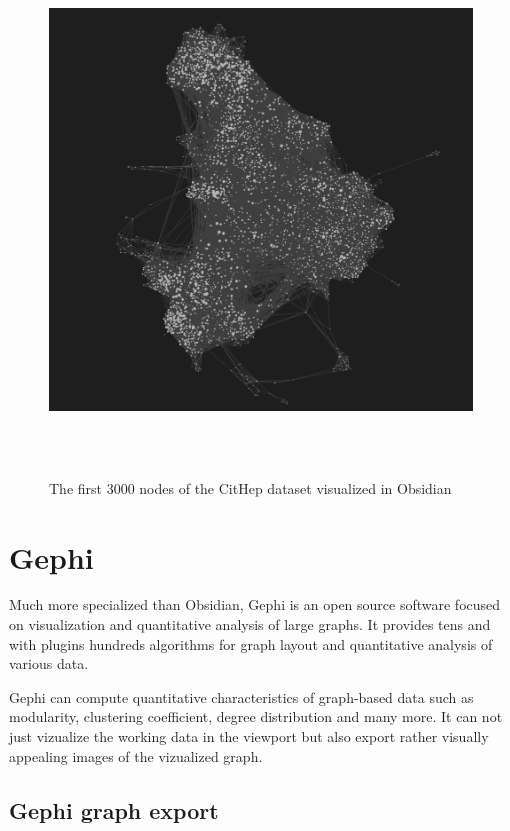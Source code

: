 \begin{figure}[p]\centering
  \includegraphics[width=140mm, height=140mm]{img/Obsidian_3000}
  \caption{The first 3000 nodes of the CitHep dataset visualized in Obsidian}
  \label{obr:obsidian_3000}
\end{figure}

\section{Gephi}

Much more specialized than Obsidian, Gephi is an open source software focused on visualization and quantitative analysis of large graphs.
It provides tens and with plugins hundreds  algorithms for graph layout and quantitative analysis of various data.

Gephi can compute quantitative characteristics of graph-based data such as modularity, clustering coefficient, degree distribution and many more.
It can not just vizualize the working data in the viewport but also export rather visually appealing images of the vizualized graph.

\subsection*{Gephi graph export}

